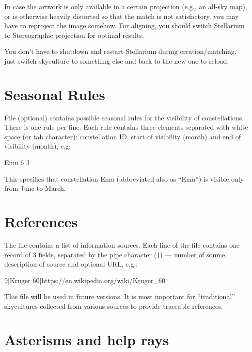 In case the artwork is only available in a certain projection (e.g.,
an all-sky map), or is otherwise heavily distorted so that the match
is not satisfactory, you may have to reproject the image somehow. For
aligning, you should switch Stellarium to Stereographic projection for
optimal results.

You don't have to shutdown and restart Stellarium during
creation/matching, just switch skyculture to something else and back
to the new one to reload.

\section{Seasonal Rules}
\label{sec:skycultures:seasonal_rules}

File  (optional) contains possible seasonal rules for
the visibility of constellations. There is one rule per line. Each
rule contains three elements separated with white space (or tab
character): constellation ID, start of visibility (month) and end of
visibility (month), e.g:

\begin{configfile}
  Emu 6 3
\end{configfile}

\noindent This specifies that constellation Emu (abbreviated also as ``Emu'') is
visible only from June to March.

\section{References}
\label{sec:skycultures:references}

\noindent{}The file  contains a list of information sources. 
Each line of the file contains one record of 3 fields,
separated by the pipe character (\texttt{|}) --- number of source, 
description of source and optional URL, e.g.:

\begin{configfile}
9|Kruger 60|https://en.wikipedia.org/wiki/Kruger_60
\end{configfile}

This file will be used in future versions. It is most important for ``traditional'' skycultures collected from various sources to provide traceable references. 

\section{Asterisms and help rays}
\label{sec:skycultures:asterisms}

